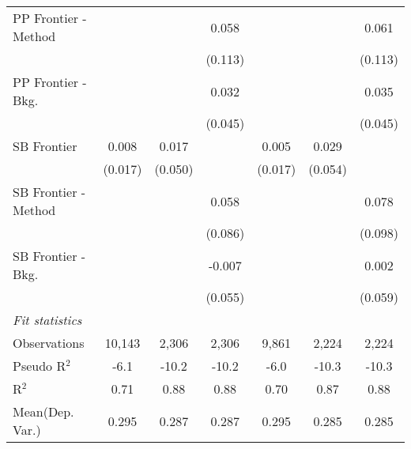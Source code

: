 \begin{tabular}{lcccccc}
   PP Frontier - Method &                &         & 0.058   &                &         & 0.061\\   
                        &                &         & (0.113) &                &         & (0.113)\\   
   PP Frontier - Bkg.   &                &         & 0.032   &                &         & 0.035\\   
                        &                &         & (0.045) &                &         & (0.045)\\   
   SB Frontier          & 0.008          & 0.017   &         & 0.005          & 0.029   &   \\   
                        & (0.017)        & (0.050) &         & (0.017)        & (0.054) &   \\   
   SB Frontier - Method &                &         & 0.058   &                &         & 0.078\\   
                        &                &         & (0.086) &                &         & (0.098)\\   
   SB Frontier - Bkg.   &                &         & -0.007  &                &         & 0.002\\   
                        &                &         & (0.055) &                &         & (0.059)\\   
   \midrule
   \emph{Fit statistics}\\
   Observations         & 10,143         & 2,306   & 2,306   & 9,861          & 2,224   & 2,224\\  
   Pseudo R$^2$         & -6.1           & -10.2   & -10.2   & -6.0           & -10.3   & -10.3\\  
   R$^2$                & 0.71           & 0.88    & 0.88    & 0.70           & 0.87    & 0.88\\  
Mean(Dep. Var.) & 0.295 & 0.287 & 0.287 & 0.295 & 0.285 & 0.285 \\
   

\end{tabular}
